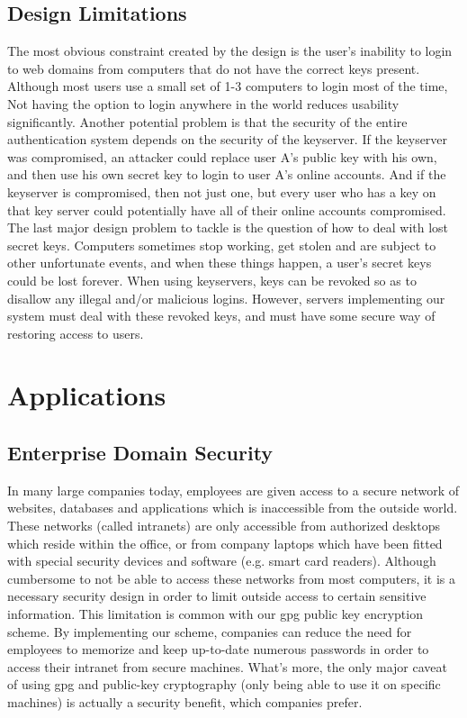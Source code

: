 \documentclass[11pt]{article}
\begin{document}
\subsection{Design Limitations}
The most obvious constraint created by the design is the user's inability to login to web domains from computers that do not have the correct keys present.  Although most users use a small set of 1-3 computers to login most of the time, Not having the option to login anywhere in the world reduces usability significantly.  Another potential problem is that the security of the entire authentication system depends on the security of the keyserver.  If the keyserver was compromised, an attacker could replace user A's public key with his own, and then use his own secret key to login to user A's online accounts.  And if the keyserver is compromised, then not just one, but every user who has a key on that key server could potentially have all of their online accounts compromised.  The last major design problem to tackle is the question of how to deal with lost secret keys.  Computers sometimes stop working, get stolen and are subject to other unfortunate events, and when these things happen, a user's secret keys could be lost forever.  When using keyservers, keys can be revoked so as to disallow any illegal and/or malicious logins.  However, servers implementing our system must deal with these revoked keys, and must have some secure way of restoring access to users.

\section{Applications} \label{sec:applications}
\subsection{Enterprise Domain Security} \label{subsec:enterprisedomainsecurity}
In many large companies today, employees are given access to a secure network of websites, databases and applications which is inaccessible from the outside world.  These networks (called intranets) are only accessible from authorized desktops which reside within the office, or from company laptops which have been fitted with special security devices and software (e.g. smart card readers).  Although cumbersome to not be able to access these networks from most computers, it is a necessary security design in order to limit outside access to certain sensitive information.  This limitation is common with our gpg public key encryption scheme.  By implementing our scheme, companies can reduce the need for employees to memorize and keep up-to-date numerous passwords in order to access their intranet from secure machines.  What's more, the only major caveat of using gpg and public-key cryptography (only being able to use it on specific machines) is actually a security benefit, which companies prefer.
\end{document}

